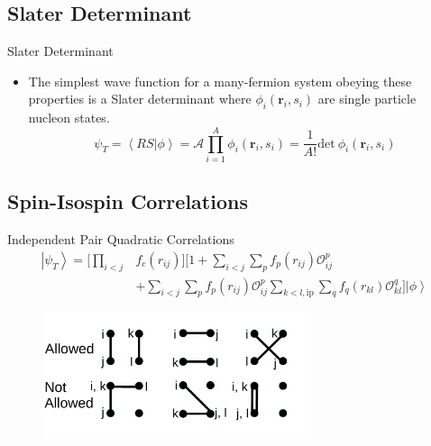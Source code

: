 \documentclass{beamer}
\newcommand{\ket}[1]{\left| #1 \right>}
\newcommand{\braket}[2]{\left< #1 | #2 \right>}
\newcommand{\fpij}{f_p(r_{ij})}
\newcommand{\Opij}{\mathcal{O}_{ij}^p}
\newcommand{\fOpij}{\sum\limits_{i<j}\sum\limits_p \fpij\Opij}
\newcommand{\fqkl}{f_q(r_{kl})}
\newcommand{\Oqkl}{\mathcal{O}_{kl}^q}
\newcommand{\fOqklip}{\sum\limits_{k<l,\mathrm{ip}}\sum\limits_q \fqkl\Oqkl}
\begin{document}
\subsection{Slater Determinant}
\begin{frame}{Slater Determinant}
\begin{itemize}
   \item The simplest wave function for a many-fermion system obeying these properties is a Slater determinant where $\phi_i(\mathbf{r}_i,s_i)$ are single particle nucleon states.
   \begin{equation*}
      \psi_{T} = \braket{RS}{\phi}= \mathcal{A} \prod\limits_{i=1}^A \phi_i(\mathbf{r}_i,s_i) = \frac{1}{A!} \mathrm{det}~\phi_i(\mathbf{r}_i,s_i)
   \end{equation*}
\end{itemize}
\end{frame}

\subsection{Spin-Isospin Correlations}
\begin{frame}{Independent Pair Quadratic Correlations}
\begin{equation*}
\begin{split}
   \ket{\psi_T} = \Bigg[\prod\limits_{i<j}&f_c(r_{ij})\Bigg] \Bigg[1+\fOpij \\
   & + \fOpij\fOqklip \Bigg] \ket{\phi}
\end{split}
\end{equation*}
\begin{figure}[h]
   \centering
   \includegraphics[width=0.7\textwidth]{pairing.pdf}
\end{figure}
\end{frame}
\end{document}
